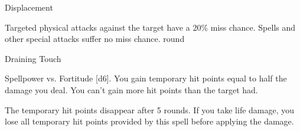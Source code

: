 \begin{spellsection}[Lesser]{Displacement}
    \begin{spellheader}
    \end{spellheader}
    \begin{spellcontent}
        \begin{spelltargetinginfo}
        \end{spelltargetinginfo}
        \begin{spelleffects}
            \spelleffect Targeted physical attacks against the target have a 20\% miss chance. Spells and other special attacks suffer no miss chance.
             round
        \end{spelleffects}
    \end{spellcontent}
    \begin{spellfooter}
    \end{spellfooter}
\end{spellsection}

\begin{spellsection}{Draining Touch}
    \begin{spellheader}
    \end{spellheader}
    \begin{spellcontent}
        \begin{spelltargetinginfo}
        \end{spelltargetinginfo}
        \begin{spelleffects}
            \begin{spellattack}{Spellpower vs. Fortitude}
                \spellsuccess {}[d6]. You gain temporary hit points equal to half the damage you deal. You can't gain more hit points than the target had.

                The temporary hit points disappear after 5 rounds. If you take life damage, you lose all temporary hit points provided by this spell before applying the damage.
            \end{spellattack}
        \end{spelleffects}
    \end{spellcontent}
    \begin{spellfooter}
    \end{spellfooter}
\end{spellsection}

